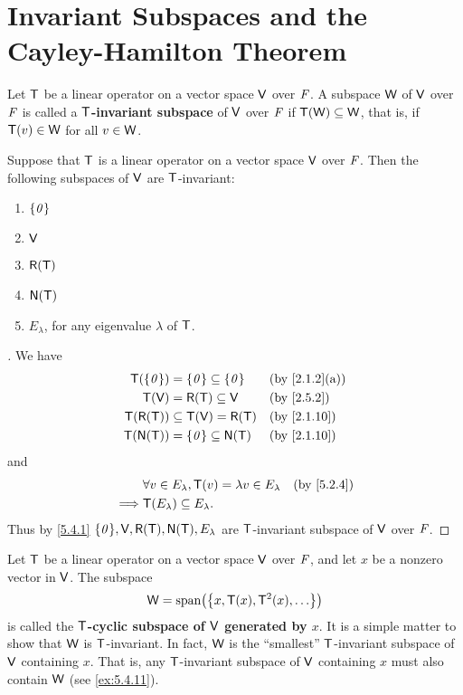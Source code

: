 \section{Invariant Subspaces and the Cayley-Hamilton Theorem}\label{sec:5.4}

\begin{defn}\label{5.4.1}
	Let \(\mathsf{T}\) be a linear operator on a vector space \(\mathsf{V}\) over \(\mathit{F}\).
	A subspace \(\mathsf{W}\) of \(\mathsf{V}\) over \(\mathit{F}\) is called a \textbf{\(\mathsf{T}\)-invariant subspace} of \(\mathsf{V}\) over \(\mathit{F}\) if \(\mathsf{T}(\mathsf{W}) \subseteq \mathsf{W}\), that is, if \(\mathsf{T}(v) \in \mathsf{W}\) for all \(v \in \mathsf{W}\).
\end{defn}

\begin{eg}\label{5.4.2}
	Suppose that \(\mathsf{T}\) is a linear operator on a vector space \(\mathsf{V}\) over \(\mathit{F}\).
	Then the following subspaces of \(\mathsf{V}\) are \(\mathsf{T}\)-invariant:
	\begin{enumerate}
		\item \(\left\lbrace\mathit{0}\right\rbrace\)
		\item \(\mathsf{V}\)
		\item \(\rg{\T}\)
		\item \(\ns{\T}\)
		\item \(E_{\lambda}\), for any eigenvalue \(\lambda\) of \(\mathsf{T}\).
	\end{enumerate}
\end{eg}

\begin{proof}[]
	We have
	\begin{align*}
		\T(\set{\zv}) & = \set{\zv} \subseteq \set{\zv} &  & \by{2.1.2}[a] \\
		\T(\V)        & = \rg{\T} \subseteq \V          &  & \by{2.5.2}    \\
		\T(\rg{\T})   & \subseteq \T(\V) = \rg{\T}      &  & \by{2.1.10}   \\
		\T(\ns{\T})   & = \set{\zv} \subseteq \ns{\T}   &  & \by{2.1.10}
	\end{align*}
	and
	\begin{align*}
		         & \forall v \in E_{\lambda}, \T(v) = \lambda v \in E_{\lambda} &  & \by{5.2.4} \\
		\implies & \T(E_{\lambda}) \subseteq E_{\lambda}.
	\end{align*}
	Thus by \cref{5.4.1} \(\set{\zv}, \V, \rg{\T}, \ns{\T}, E_{\lambda}\) are \(\mathsf{T}\)-invariant subspace of \(\mathsf{V}\) over \(\mathit{F}\).
\end{proof}

\begin{defn}\label{5.4.3}
	Let \(\mathsf{T}\) be a linear operator on a vector space \(\mathsf{V}\) over \(\mathit{F}\), and let \(x\) be a nonzero vector in \(\mathsf{V}\).
	The subspace
	\[
		\W = \spn{\set{x, \T(x), \T^2(x), \dots}}
	\]
	is called the \textbf{\(\mathsf{T}\)-cyclic subspace of \(\mathsf{V}\) generated by \(x\)}.
	It is a simple matter to show that \(\mathsf{W}\) is \(\mathsf{T}\)-invariant.
	In fact, \(\mathsf{W}\) is the ``smallest'' \(\mathsf{T}\)-invariant subspace of \(\mathsf{V}\) containing \(x\).
	That is, any \(\mathsf{T}\)-invariant subspace of \(\mathsf{V}\) containing \(x\) must also contain \(\mathsf{W}\)
	(see \cref{ex:5.4.11}).
\end{defn}

